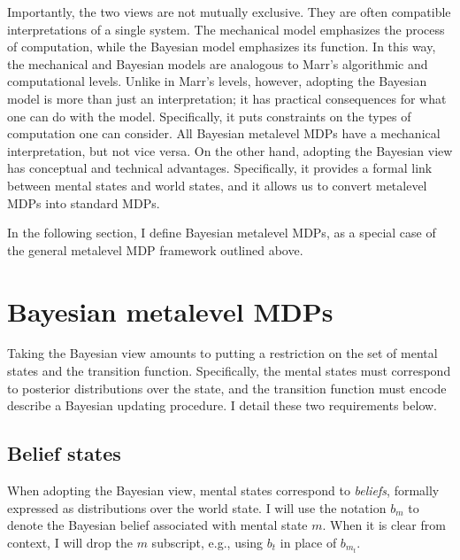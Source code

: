 Importantly, the two views are not mutually exclusive. They are often compatible interpretations of a single system. The mechanical model emphasizes the process of computation, while the Bayesian model emphasizes its function. In this way, the mechanical and Bayesian models are analogous to Marr's algorithmic and computational levels. Unlike in Marr's levels, however, adopting the Bayesian model is more than just an interpretation; it has practical consequences for what one can do with the model. Specifically, it puts constraints on the types of computation one can consider. All Bayesian metalevel MDPs have a mechanical interpretation, but not vice versa. On the other hand, adopting the Bayesian view has conceptual and technical advantages. Specifically, it provides a formal link between mental states and world states, and it allows us to convert metalevel MDPs into standard MDPs.

In the following section, I define Bayesian metalevel MDPs, as a special case of the general metalevel MDP framework outlined above.

\section{Bayesian metalevel MDPs}\label{sec:bayesian-metamdp}

Taking the Bayesian view amounts to putting a restriction on the set of mental states and the transition function. Specifically, the mental states must correspond to posterior distributions over the state, and the transition function must encode describe a Bayesian updating procedure. I detail these two requirements below.


\subsection{Belief states}

When adopting the Bayesian view, mental states correspond to \emph{beliefs}, formally expressed as distributions over the world state. I will use the notation $b_m$ to denote the Bayesian belief associated with mental state $m$. When it is clear from context, I will drop the $m$ subscript, e.g., using $b_t$ in place of $b_{m_t}$. 

